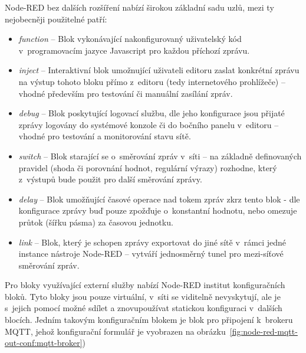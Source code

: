 Node-RED bez dalších rozšíření nabízí širokou základní sadu uzlů, mezi ty nejobecněji použitelné patří:

\begin{itemize}
    \item\emph{function} -- Blok vykonávající nakonfigurovaný uživatelský kód v~programovacím jazyce Javascript pro
    každou příchozí zprávu.
    \item\emph{inject} -- Interaktivní blok umožnující uživateli editoru zaslat konkrétní zprávu na výstup tohoto bloku
    přímo z~editoru (tedy internetového prohlížeče) -- vhodné především pro testování či manuální zasílání zpráv.
    \item\emph{debug} -- Blok poskytující logovací službu, dle jeho konfigurace jsou přijaté zprávy logovány do systémové konzole či do
    bočního panelu v~editoru -- vhodné pro testování a monitorování stavu sítě.
    \item\emph{switch} -- Blok starající se o~směrování zpráv v~síti -- na základně definovaných pravidel
    (shoda či porovnání hodnot, regulární výrazy) rozhodne, který z~výstupů bude použit pro další směrování zprávy.
    \item\emph{delay} -- Blok umožňující časové operace nad tokem zpráv zkrz tento blok - dle konfigurace zprávy buď
    pouze zpožďuje o~konstantní hodnotu, nebo omezuje průtok (šířku pásma) za časovou jednotku.
    \item\emph{link} -- Blok, který je schopen zprávy exportovat do jiné sítě v~rámci jedné instance nástroje
    Node-RED -- vytváří jednosměrný tunel pro mezi-síťové směrování zpráv.
\end{itemize}

Pro bloky využívající externí služby nabízí Node-RED institut konfiguračních bloků.
Tyto bloky jsou pouze virtuální, v~síti se viditelně nevyskytují, ale je
s~jejich pomocí možné sdílet a znovupoužívat statickou konfiguraci v~dalších blocích.
Jedním takovým konfiguračním blokem je blok pro připojení k~brokeru MQTT, jehož konfigurační formulář je vyobrazen na
obrázku~\ref{fig:node-red-mqtt-out-conf:mqtt-broker})

